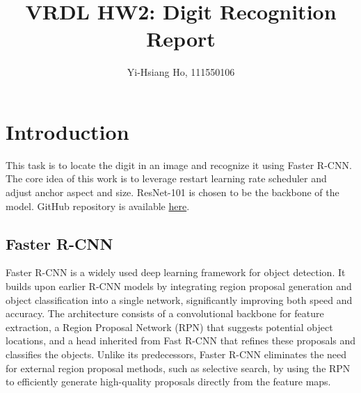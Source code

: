 \documentclass[10pt,twocolumn,letterpaper]{article}
\begin{document}
\title{VRDL HW2: Digit Recognition Report}

\author{Yi-Hsiang Ho, 111550106
}
\maketitle

\section{Introduction}
\label{sec:intro}

This task is to locate the digit in an image and recognize it using Faster
R-CNN. The core idea of this work is to leverage restart learning rate
scheduler and adjust anchor aspect and size. ResNet-101 is chosen to be the
backbone of the model. GitHub repository is available
\href{https://github.com/Sean20405/NYCU-DLVR-HW2}{here}.


\subsection{Faster R-CNN}

Faster R-CNN is a widely used deep learning framework for object detection.
It builds upon earlier R-CNN models by integrating region proposal
generation and object classification into a single network, significantly
improving both speed and accuracy. The architecture consists of a
convolutional backbone for feature extraction, a Region Proposal Network
(RPN) that suggests potential object locations, and a head inherited from
Fast R-CNN that refines these proposals and classifies the objects. Unlike
its predecessors, Faster R-CNN eliminates the need for external region
proposal methods, such as selective search, by using the RPN to efficiently
generate high-quality proposals directly from the feature maps.~\cite{FasterRCNN}
\end{document}
